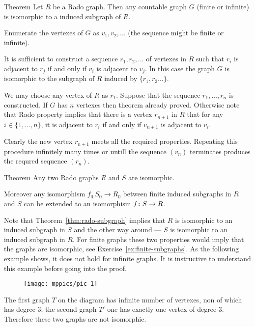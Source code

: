 \begin{thm}{Theorem}\label{thm:rado-subgraph}
Let $R$ be a Rado graph.
Then any countable graph $G$ (finite or infinite) is isomorphic to a induced subgraph of $R$. 
\end{thm}

Enumerate the vertexes of $G$ as $v_1 , v_2 , \dots$ (the sequence might be finite or infinite).

It is sufficient to construct a sequence $r_1,r_2,\dots$ of vertexes in $R$ such that $r_i$ is adjacent to $r_j$ if and only if $v_i$ is adjacent to $v_j$.
In this case the graph $G$ is isomorphic to the subgraph of $R$ induced by $\{r_1,r_2\dots\}$.

We may choose any vertex of $R$ as $r_1$.
Suppose that the sequence $r_1,\dots,r_n$ is constructed.
If $G$ has $n$ vertexes then theorem already proved.
Otherwise note that Rado property implies that there is a vertex $r_{n+1}$ in $R$ that for any $i\in\{1,\dots,n\}$, it is adjacent to $r_i$ if and only if $v_{n+1}$ is adjacent to $v_i$.

Clearly the new vertex $r_{n+1}$ meets all the required properties.
Repeating this procedure infinitely many times or untill the sequence $(v_n)$ terminates produces the requred sequence $(r_n)$.
\qeds


\begin{thm}{Theorem}
Any two Rado graphs $R$ and $S$ are isomorphic.

Moreover any isomorphism $f_0\:S_0\to R_0$ between finite induced subgraphs in $R$ and $S$ can be extended to an isomorphism $f\:S\z\to R$.
\end{thm}

Note that Theorem~\ref{thm:rado-subgraph} implies that $R$ is isomorphic to an induced subgraph in $S$ and the other way around --- $S$ is isomorphic to an induced subgraph in $R$.
For finite graphs these two properties would imply that the graphs are isomorphic, see Exercise~\ref{ex:finite-subgraphs}.
As the following example shows, it does not hold for infinite graphs.
It is instructive to understand this example before going into the proof.

\begin{figure}[h!]%
\vskip-0mm
\centering
\texttt{[image: mppics/pic-1]}
\vskip-0mm
\end{figure}
 
The first graph $T$ on the diagram has infinite number of vertexes, non of which has degree 3;
the second graph $T'$ one has exactly one vertex of degree 3. 
Therefore these two graphs are not isomorphic.

